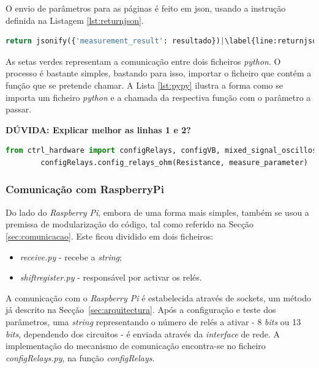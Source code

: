 O envio de parâmetros para as páginas é feito em \acrfull{json}, usando a instrução definida na Listagem \ref{lst:returnjson}.

\begin{minipage}{0.9\linewidth}
	\begin{lstlisting}[language=python, escapechar=|, caption=Comunicação \textit{views.py} - \acrshort{html}, label=lst:returnjson]
	return jsonify({'measurement_result': resultado})|\label{line:returnjson}|
	\end{lstlisting}
\end{minipage}

As setas verdes representam a comunicação entre dois ficheiros \textit{python}. O processo é bastante simples, bastando para isso, importar o ficheiro que contém a função que se pretende chamar. A Lista \ref{lst:pypy} ilustra a forma como se importa um ficheiro \textit{python} e a chamada da respectiva função com o parâmetro a passar.

\textbf{DÚVIDA: Explicar melhor as linhas 1 e 2?}

\begin{minipage}{0.9\linewidth}
	\begin{lstlisting}[language=python, escapechar=|, caption=Comunicação \textit{python} - \textit{python}, label=lst:pypy]
		from ctrl_hardware import configRelays, configVB, mixed_signal_oscilloscope |\label{line:ficheiros}|
		configRelays.config_relays_ohm(Resistance, measure_parameter) |\label{line:trueparameter}|
	\end{lstlisting}
\end{minipage}

\subsubsection{Comunicação com RaspberryPi}
\label{sec:raspberrypi}
Do lado do \textit{Raspberry Pi}, embora de uma forma mais simples, também se usou a premissa de modularização do código, tal como referido na Secção \ref{sec:comunicacao}. Este ficou dividido em dois ficheiros:
\begin{itemize}
	\item \textit{receive.py} - recebe a \textit{string};
	\item \textit{shift\textunderscore register.py} - responsável por activar os relés.
\end{itemize}

A comunicação com o \textit{Raspberry Pi} é estabelecida através de sockets, um método já descrito na Secção~\ref{sec:arquitectura}. Após a configuração e teste dos parâmetros, uma \textit{string} representando o número de relés a ativar - 8 \textit{bits} ou 13 \textit{bits}, dependendo dos circuitos - é enviada através da \textit{interface} de rede. A implementação do mecanismo de comunicação encontra-se no ficheiro \textit{configRelays.py}, na função \textit{config\textunderscore Relays}.

